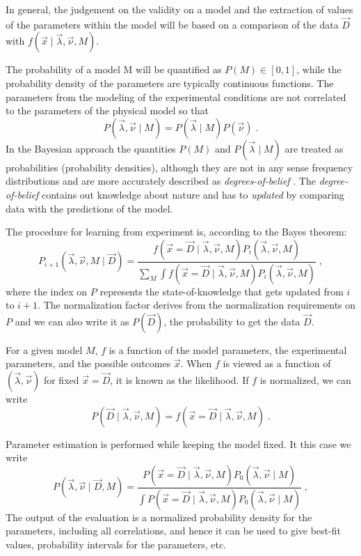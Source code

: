 In general, the judgement on the validity on a model and the extraction of values of the parameters within the model will be based on a comparison of the data $\vec{D}$ with $f(\vec{x}\mid\vec{\lambda},\vec{\nu},M)$.

 The probability of a model M will be quantified as $P(M)\in[0,1]$, while the probability density of the parameters are typically continuous functions. The parameters from the modeling of the experimental conditions are not correlated to the parameters of the physical model so that
\[P(\vec{\lambda},\vec{\nu}\mid M)=P(\vec{\lambda}\mid M)P(\vec{\nu})\;.\]
In the Bayesian approach the quantities $P(M)$ and $P(\vec{\lambda}\mid M)$ are treated as probabilities (probability densities), although they are not in any sense frequency distributions and are more accurately described as \emph{degrees-of-belief} \cite{bayesbook}. The \emph{degree-of-belief} contains out knowledge about nature and has to \emph{updated} by comparing data with the predictions of the model.

The procedure for learning from experiment is, according to the Bayes theorem:
\[P_{i+1}(\vec{\lambda},\vec{\nu},M\mid\vec{D})=\frac{f(\vec{x}=\vec{D}\mid\vec{\lambda},\vec{\nu},M)P_i(\vec{\lambda},\vec{\nu},M)}{\sum_M\int f(\vec{x}=\vec{D}\mid\vec{\lambda},\vec{\nu},M)P_i(\vec{\lambda},\vec{\nu},M)}\;,\]
where the index on $P$ represents the state-of-knowledge that gets updated from $i$ to $i+1$. The normalization factor derives from the normalization requirements on $P$ and we can also write it as $P(\vec{D})$, the probability to get the data $\vec{D}$.

For a given model $M$, $f$ is a function of the model parameters, the experimental parameters, and the possible outcomes $\vec{x}$. When $f$ is viewed as a function of $(\vec{\lambda},\vec{\nu})$ for fixed $\vec{x}=\vec{D}$, it is known as the likelihood. If $f$ is normalized, we can write
\[P(\vec{D}\mid\vec{\lambda},\vec{\nu},M)=f(\vec{x}=\vec{D}\mid\vec{\lambda},\vec{\nu},M)\;.\]

 Parameter estimation is performed while keeping the model fixed. It this case we write
\begin{equation}P(\vec{\lambda},\vec{\nu}\mid\vec{D},M)=\frac{P(\vec{x}=\vec{D}\mid\vec{\lambda},\vec{\nu},M)P_0(\vec{\lambda},\vec{\nu}\mid M)}{\int P(\vec{x}=\vec{D}\mid\vec{\lambda},\vec{\nu},M)P_0(\vec{\lambda},\vec{\nu}\mid M)}\;,\label{eq:posterior}\end{equation}
The output of the evaluation is a normalized probability density for the parameters, including all correlations, and hence it can be used to give best-fit values, probability intervals for the parameters, etc.

